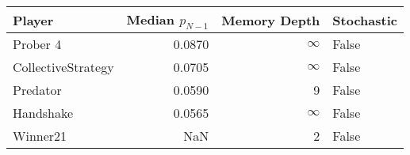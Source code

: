 \begin{tabular}{lrrl}
\toprule
             Player &  Median $p_{N-1}$ &  Memory Depth & Stochastic \\
\midrule
           Prober 4 &            0.0870 &            \(\infty\) &      False \\
 CollectiveStrategy &            0.0705 &            \(\infty\) &      False \\
           Predator &            0.0590 &             9 &      False \\
          Handshake &            0.0565 &            \(\infty\) &      False \\
           Winner21 &               NaN &             2 &      False \\
\bottomrule
\end{tabular}

